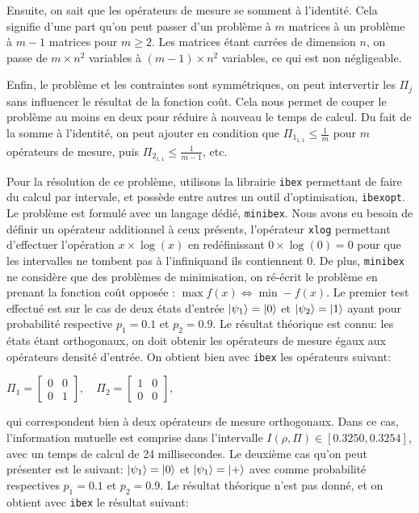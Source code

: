 \documentclass[12pt,a4paper]{article}
\begin{document}
    Ensuite, on sait que les opérateurs de mesure se somment à l'identité. Cela signifie d'une part qu'on peut passer d'un problème à $m$ matrices à un problème à $m-1$ matrices pour $m \geq 2$. Les matrices étant carrées de dimension $n$, on passe de $m \times n^2$ variables à $(m - 1) \times n^2$ variables, ce qui est non négligeable.

    Enfin, le problème et les contraintes sont symmétriques, on peut intervertir les $\Pi_j$ sans influencer le résultat de la fonction coût. Cela nous permet de couper le problème au moins en deux pour réduire à nouveau le temps de calcul. Du fait de la somme à l'identité, on peut ajouter en condition que $\Pi_{1_{1, 1}} \leq \frac{1}{m}$ pour $m$ opérateurs de mesure, puis $\Pi_{2_{1, 1}} \leq \frac{1}{m-1}$, etc.

    \medbreak

    Pour la résolution de ce problème, utilisons la librairie \texttt{ibex} permettant de faire du calcul par intervale, et possède entre autres un outil d'optimisation, \texttt{ibexopt}. Le problème est formulé avec un langage dédié, \texttt{minibex}. Nous avons eu besoin de définir un opérateur additionnel à ceux présents, l'opérateur \texttt{xlog} permettant d'effectuer l'opération $x \times \log(x)$ en redéfinissant $0 \times \log(0) = 0$ pour que les intervalles ne tombent pas à l'infiniquand ils contiennent 0. De plus, \texttt{minibex} ne considère que des problèmes de minimisation, on ré-écrit le problème en prenant la fonction coût opposée : $\max f(x) \Leftrightarrow \min -f(x)$.
    \medbreak
    Le premier test effectué est sur le cas de deux états d'entrée $\ket{\psi_1} = \ket{0}$ et $\ket{\psi_2} = \ket{1}$ ayant pour probabilité respective $p_1 = 0.1$ et $p_2 = 0.9$. Le résultat théorique est connu: les états étant orthogonaux, on doit obtenir les opérateurs de mesure égaux aux opérateurs densité d'entrée. On obtient bien avec \texttt{ibex} les opérateurs suivant:

    $\Pi_1 = \begin{bmatrix} 0 & 0 \\ 0 & 1\end{bmatrix} , \quad \Pi_2 = \begin{bmatrix} 1 & 0 \\ 0 & 0\end{bmatrix},$

    qui correspondent bien à deux opérateurs de mesure orthogonaux. Dans ce cas, l'information mutuelle est comprise dans l'intervalle $I(\rho, \Pi) \in [0.3250, 0.3254]$, avec un temps de calcul de 24 millisecondes.
\medbreak
    Le deuxième cas qu'on peut présenter est le suivant: $\ket{\psi_1} = \ket{0}$ et $\ket{\psi_1} = \ket{+}$ avec comme probabilité respectives $p_1 = 0.1$ et $p_2 = 0.9$. Le résultat théorique n'est pas donné, et on obtient avec \texttt{ibex} le résultat suivant:
\end{document}
